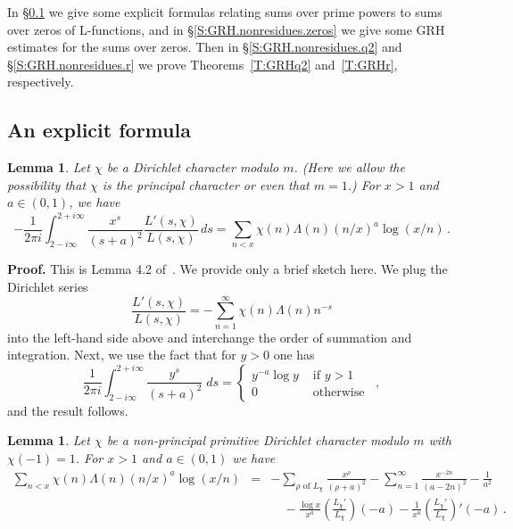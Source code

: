 \documentclass{amsart}
\newtheorem{lemma}[theorem]{Lemma}
\numberwithin{equation}{section}
\numberwithin{table}{section}
\begin{document}
In \S\ref{S:GRH.nonresidues.explicit} we give some explicit formulas
relating sums over prime powers to sums over zeros of L-functions,
and in \S\ref{S:GRH.nonresidues.zeros} we give some GRH estimates for
the sums over zeros.
Then in \S\ref{S:GRH.nonresidues.q2} and
\S\ref{S:GRH.nonresidues.r} we prove 
Theorems~\ref{T:GRHq2} and~\ref{T:GRHr}, respectively.

\subsection{An explicit formula}\label{S:GRH.nonresidues.explicit}

\begin{lemma}\label{L:explicit0}
Let $\chi$ be a Dirichlet character modulo $m$.
(Here we allow the possibility that $\chi$ is the principal character or even that $m=1$.)  For $x>1$ and $a\in(0,1)$, we have
$$
  -\frac{1}{2\pi i}
  \int_{2-i\infty}^{2+i\infty}
  \frac{x^s}{(s+a)^2}
  \frac{L'(s,\chi)}{L(s,\chi)}\,ds
  =
  \sum_{n<x}
  \chi(n)\Lambda(n)(n/x)^a\log(x/n)
  \,.
$$
\end{lemma}

\noindent\textbf{Proof.}
This is Lemma 4.2 of~\cite{bach:1990}.  We provide only a brief sketch here.
We plug the Dirichlet series
$$
  \frac{L'(s,\chi)}{L(s,\chi)}
  =
  -
  \sum_{n=1}^\infty
  \chi(n)\Lambda(n)n^{-s}
$$
into the left-hand side above and interchange the order of summation and integration.
Next, we use the fact that for $y>0$ one has
$$
  \frac{1}{2\pi i}
  \int_{2-i\infty}^{2+i\infty}
  \frac{y^s}{(s+a)^2}\;ds
  =
  \begin{cases}
  y^{-a}\log y & \text{ if $y>1$ }\\
  0 & \text{ otherwise }
  \end{cases}
  \,,
$$
and the result follows.
{\raisebox{-.25ex}{\scalebox{.786}[1.272]{$\blacksquare$}}}

\begin{lemma}\label{L:explicit1}
  Let $\chi$ be a non-principal primitive Dirichlet character modulo $m$ with $\chi(-1)=1$.
  For $x>1$ and $a\in(0,1)$ we have
  \begin{eqnarray*}
  \sum_{n<x}
  \chi(n)\Lambda(n)(n/x)^a\log(x/n)
  &=&
  -\sum_{\rho\text{ of $L_\chi$}}
  \frac{x^\rho}{(\rho+a)^2}
  -
  \sum_{n=1}^\infty
  \frac{x^{-2n}}{(a-2n)^2}
    -
  \frac{1}{a^2}
  \\
  &&
  \quad
  -
  \frac{\log x}{x^a}
  \left(\frac{L_\chi'}{L_\chi}\right)(-a)
  -
  \frac{1}{x^a}
  \left(\frac{L_\chi'}{L_\chi}\right)'(-a)
  \,.
  \end{eqnarray*}
\end{lemma}
\end{document}
